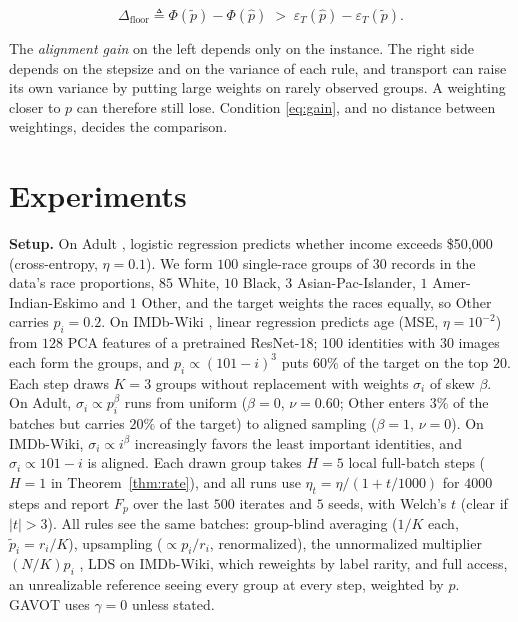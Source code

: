\documentclass{article}
\theoremstyle{definition}
\newcommand{\avot}{\textsf{GAVOT}}
\begin{document}
\begin{equation}
\Delta_{\mathrm{floor}}\triangleq\Phi(\tilde p)-\Phi(\hat p)\;>\;
\varepsilon_T(\hat p)-\varepsilon_T(\tilde p).
\label{eq:gain}
\end{equation}\vspace{-12pt}

The \emph{alignment gain} on the left depends only on the instance. The
right side depends on the stepsize and on the variance of each rule, and
transport can raise its own variance by putting large weights on rarely
observed groups. A weighting closer to $p$ can therefore still lose.
Condition \eqref{eq:gain}, and no distance between weightings, decides
the comparison.
\vspace{-16pt}\section{Experiments}
\label{sec:exp}
\vspace{-8pt}
\noindent\textbf{Setup.} On Adult \cite{uci_adult}, logistic regression
predicts whether income exceeds \$50{,}000 (cross-entropy, $\eta=0.1$). We form $100$ single-race groups of $30$ records in the data's
race proportions, $85$ White, $10$ Black, $3$ Asian-Pac-Islander, $1$
Amer-Indian-Eskimo and $1$ Other, and the target weights the races
equally, so Other carries $p_i=0.2$. On IMDb-Wiki
\cite{rothe2018imdbwiki}, linear regression predicts age (MSE,
$\eta=10^{-2}$) from $128$ PCA features of a pretrained ResNet-18; $100$
identities with $30$ images each form the groups, and
$p_i\propto(101-i)^3$ puts $60\%$ of the target on the top $20$. Each step
draws $K=3$ groups without replacement with weights $\sigma_i$ of skew
$\beta$. On Adult, $\sigma_i\propto p_i^{\beta}$ runs from uniform
($\beta=0$, $\nu=0.60$; Other enters $3\%$ of the batches but carries
$20\%$ of the target) to aligned sampling ($\beta=1$, $\nu=0$). On
IMDb-Wiki, $\sigma_i\propto i^{\beta}$ increasingly favors the least
important identities, and $\sigma_i\propto101-i$ is aligned.
Each drawn group takes $H=5$ local full-batch steps ($H=1$ in
Theorem~\ref{thm:rate}), and all runs use $\eta_t=\eta/(1+t/1000)$ for
$4000$ steps and report $F_p$ over the last $500$ iterates and $5$ seeds,
with Welch's $t$ (clear if $|t|>3$). All rules see the
same batches: group-blind averaging ($1/K$ each, $\tilde p_i=r_i/K$),
upsampling ($\propto p_i/r_i$, renormalized), the unnormalized multiplier $(N/K)p_i$ \cite{rahimi2025fedavot}, LDS \cite{yang2021dir} on
IMDb-Wiki, which reweights by label rarity, and full access, an unrealizable
reference seeing every group at every step, weighted by
$p$. \avot{} uses $\gamma=0$ unless stated.
\end{document}
